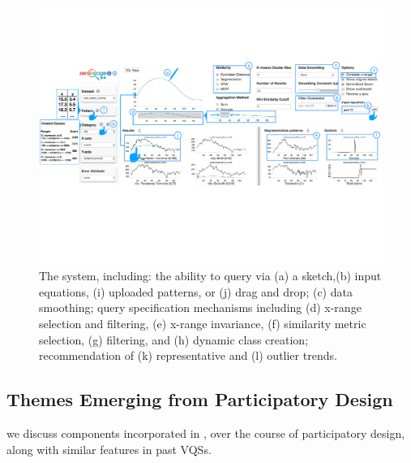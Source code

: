 \begin{figure}[ht!]
\centering
\vspace{-15pt}
\includegraphics[width=0.95\linewidth]{figures/zvpp_system.pdf} %
\vspace{-5pt}\caption{The \zvpp system, including: the ability to query via (a) a sketch,(b) input equations, (i) uploaded patterns, or (j) drag and drop; (c) data smoothing; query specification mechanisms including (d) x-range selection and filtering, (e) x-range invariance, (f) similarity metric selection, (g) filtering, and (h) dynamic class creation; recommendation of (k) representative and (l) outlier trends.} %
\label{zvOverview}
\vspace{-5pt}
\end{figure}
\subsection{Themes Emerging from Participatory Design\label{sec:pd_findings}}
 we discuss components 
incorporated in \zvpp, over the course of participatory design, 
along with similar features in past VQSs.

